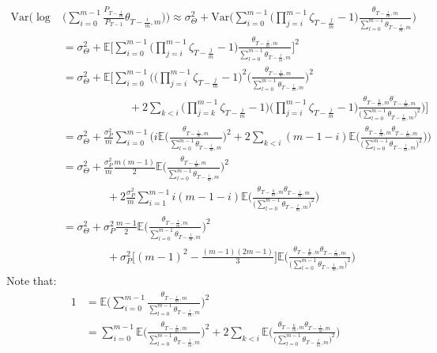 \begin{align*}
 \mathrm{Var}\Bigg(\log &\Bigg(\sum_{i=0}^{m-1} \frac{P_{T-\frac{i}{m}}}{P_{T-1}} \theta_{T-\frac{i}{m},m} \Bigg) \Bigg)
\approx \sigma^2_{\Theta} + \mathrm{Var}\Bigg( \sum_{i=0}^{m-1} \Big(\prod_{j=i}^{m-1} \zeta_{T-\frac{j}{m}}   -1\Big) \frac{\theta_{T-\frac{i}{m},m}}{\sum_{l=0}^{m-1} \theta_{T-\frac{l}{m},m}} \Bigg) \\
&= \sigma^2_{\Theta} + \mathbb{E}\Bigg[ \sum_{i=0}^{m-1} \Big(\prod_{j=i}^{m-1} \zeta_{T-\frac{j}{m}}   -1\Big) \frac{\theta_{T-\frac{i}{m},m}}{\sum_{l=0}^{m-1} \theta_{T-\frac{l}{m},m}} \Bigg]^2 \\
&= \sigma^2_{\Theta} + \mathbb{E}\Bigg[ \sum_{i=0}^{m-1} \Bigg( \Big(\prod_{j=i}^{m-1} \zeta_{T-\frac{j}{m}}   -1\Big)^2 \Bigg(\frac{\theta_{T-\frac{i}{m},m}}{\sum_{l=0}^{m-1} \theta_{T-\frac{l}{m},m}} \Bigg)^2 \\
& \qquad \qquad \qquad + 2 \sum_{k<i} \Big(\prod_{j=k}^{m-1} \zeta_{T-\frac{j}{m}}   -1\Big) \Big(\prod_{j=i}^{m-1} \zeta_{T-\frac{j}{m}}   -1\Big) \frac{\theta_{T-\frac{k}{m},m} \theta_{T-\frac{i}{m},m}}{\Big( \sum_{l=0}^{m-1} \theta_{T-\frac{l}{m},m} \Big)^2}  \Bigg) \Bigg] \\
&= \sigma^2_{\Theta} + \frac{\sigma^2_P}{m} \sum_{i=0}^{m-1} \Bigg( i\mathbb{E} \Bigg(\frac{\theta_{T-\frac{i}{m},m}}{\sum_{l=0}^{m-1} \theta_{T-\frac{l}{m},m}} \Bigg)^2  + 2 \sum_{k<i} (m-1-i)\mathbb{E}\Bigg( \frac{\theta_{T-\frac{k}{m},m} \theta_{T-\frac{i}{m},m}}{\Big( \sum_{l=0}^{m-1} \theta_{T-\frac{l}{m},m} \Big)^2} \Bigg) \Bigg)  \\
&= \sigma^2_{\Theta} + \frac{\sigma^2_P}{m} \frac{m(m-1)}{2}\mathbb{E} \Bigg(\frac{\theta_{T-\frac{i}{m},m}}{\sum_{l=0}^{m-1} \theta_{T-\frac{l}{m},m}} \Bigg)^2 \\
& \qquad \qquad + 2  \frac{\sigma^2_P}{m} \sum_{i=1}^{m-1} i (m-1-i)\mathbb{E}\Bigg( \frac{\theta_{T-\frac{k}{m},m} \theta_{T-\frac{i}{m},m}}{\Big( \sum_{l=0}^{m-1} \theta_{T-\frac{l}{m},m} \Big)^2} \Bigg)  \\
&= \sigma^2_{\Theta} + \sigma^2_P \frac{m-1}{2}\mathbb{E} \Bigg(\frac{\theta_{T-\frac{i}{m},m}}{\sum_{l=0}^{m-1} \theta_{T-\frac{l}{m},m}} \Bigg)^2 \\
& \qquad \qquad +   \sigma^2_P\Bigg[ (m-1)^2 - \frac{(m-1)(2m-1)}{3} \Bigg]\mathbb{E}\Bigg( \frac{\theta_{T-\frac{k}{m},m} \theta_{T-\frac{i}{m},m}}{\Big( \sum_{l=0}^{m-1} \theta_{T-\frac{l}{m},m} \Big)^2} \Bigg) 
\end{align*}
Note that:
\begin{align*}
1 &= \mathbb{E} \Bigg(\sum_{i=0}^{m-1} \frac{\theta_{T-\frac{i}{m},m}}{\sum_{l=0}^{m-1} \theta_{T-\frac{l}{m},m}} \Bigg)^2 \\
&= \sum_{i=0}^{m-1}\mathbb{E} \Bigg( \frac{\theta_{T-\frac{i}{m},m}}{\sum_{l=0}^{m-1} \theta_{T-\frac{l}{m},m}} \Bigg)^2 + 2 \sum_{k<i} \mathbb{E} \Bigg( \frac{\theta_{T-\frac{k}{m},m} \theta_{T-\frac{i}{m},m}}{\Big( \sum_{l=0}^{m-1} \theta_{T-\frac{l}{m},m} \Big)^2} \Bigg) 
\end{align*}
